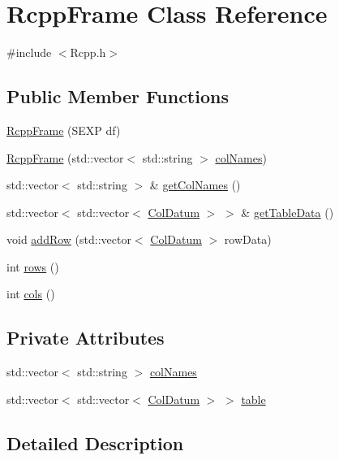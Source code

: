 \hypertarget{classRcppFrame}{
\section{RcppFrame Class Reference}
\label{classRcppFrame}
}


{\ttfamily \#include $<$Rcpp.h$>$}\subsection*{Public Member Functions}
\begin{DoxyCompactItemize}
\item 
\hyperlink{classRcppFrame_a2aad548eb7d3842ea12da3c5a67bbfbc}{RcppFrame} (SEXP df)
\item 
\hyperlink{classRcppFrame_ad3caf84a0543c0f31a97705be8902358}{RcppFrame} (std::vector$<$ std::string $>$ \hyperlink{classRcppFrame_a9b549d377248896848b6abcb8df64f82}{colNames})
\item 
std::vector$<$ std::string $>$ \& \hyperlink{classRcppFrame_ad220bfd289e745d13a99ffe323a00200}{getColNames} ()
\item 
std::vector$<$ std::vector$<$ \hyperlink{classColDatum}{ColDatum} $>$ $>$ \& \hyperlink{classRcppFrame_a3a0ac7b2822fc590f6f93ee775b134d0}{getTableData} ()
\item 
void \hyperlink{classRcppFrame_aae72791527f2947a477633151106f42c}{addRow} (std::vector$<$ \hyperlink{classColDatum}{ColDatum} $>$ rowData)
\item 
int \hyperlink{classRcppFrame_aa33ab9553bb9fa510c338a3e092d9ace}{rows} ()
\item 
int \hyperlink{classRcppFrame_aac33f787068fe1bc6f97b2b4e08c9c5d}{cols} ()
\end{DoxyCompactItemize}
\subsection*{Private Attributes}
\begin{DoxyCompactItemize}
\item 
std::vector$<$ std::string $>$ \hyperlink{classRcppFrame_a9b549d377248896848b6abcb8df64f82}{colNames}
\item 
std::vector$<$ std::vector$<$ \hyperlink{classColDatum}{ColDatum} $>$ $>$ \hyperlink{classRcppFrame_a4de0bda5c0df650b2447a4c029af0302}{table}
\end{DoxyCompactItemize}


\subsection{Detailed Description}


